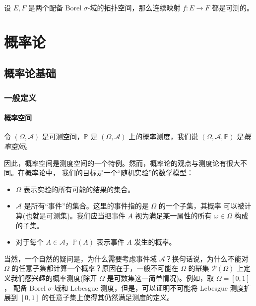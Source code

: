 \documentclass[fontset=none]{Notes}
\begin{document}
\begin{corollary}
  设 $E,F$ 是两个配备 Borel $\sigma$-域的拓扑空间，那么连续映射 $f:E\to F$ 都是可测的。
\end{corollary}






 

\part{概率论}

\chapter{概率论基础}

\section{一般定义}

\subsection{概率空间}

令 $(\Omega,\mathcal{A})$ 是可测空间，$\mathbb{P}$ 是 $(\Omega,\mathcal{A})$
上的概率测度，我们说 $(\Omega,\mathcal{A},\mathbb{P})$ 是\emph{概率空间}。

因此，概率空间是测度空间的一个特例。然而，概率论的观点与测度论有很大不同。在概率论中，
我们的目标是一个“随机实验”的数学模型：
\begin{itemize}[nosep]
  \item $\Omega$ 表示实验的所有可能的结果的集合。
  \item $\mathcal{A}$ 是所有“事件”的集合。这里的事件指的是 $\Omega$ 的一个子集，其概率
  可以被计算(也就是可测集)。我们应当把事件 $A$ 视为满足某一属性的所有 $\omega\in\Omega$ 
  构成的子集。
  \item 对于每个 $A\in \mathcal{A}$，$\mathbb{P}(A)$ 表示事件 $A$ 发生的概率。
\end{itemize}

当然，一个自然的疑问是，为什么需要考虑事件域 $\mathcal{A}$？换句话说，为什么不能对
$\Omega$ 的任意子集都计算一个概率？原因在于，一般不可能在 $\Omega$ 的幂集 $\mathcal{P}(\Omega)$
上定义我们感兴趣的概率测度(除开 $\Omega$ 是可数集这一简单情况)。例如，取 $\Omega=[0,1]$，
配备 Borel $\sigma$-域和 Lebesgue 测度，但是，可以证明不可能将 Lebesgue 测度扩展到
$[0,1]$ 的任意子集上使得其仍然满足测度的定义。
\end{document}
